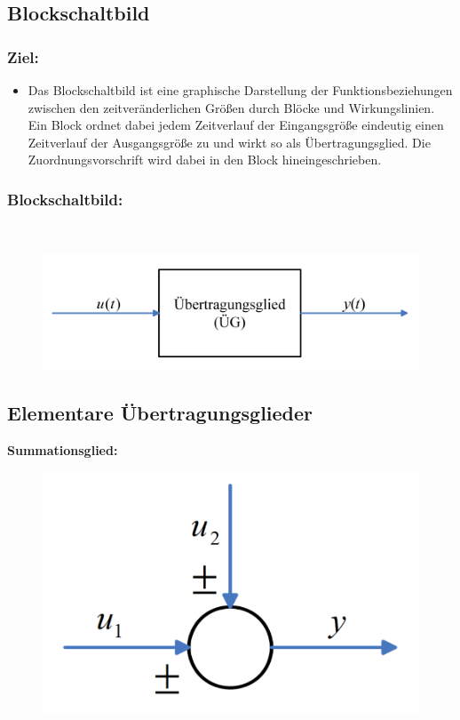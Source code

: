 \documentclass[10pt,a4paper]{article}
\begin{document}
\subsection{Blockschaltbild}
\subsubsection*{Ziel:}
\begin{itemize}
	\item Das Blockschaltbild ist eine graphische Darstellung der Funktionsbeziehungen zwischen den zeitveränderlichen Größen durch Blöcke und Wirkungslinien. Ein Block ordnet dabei jedem Zeitverlauf der Eingangsgröße eindeutig einen Zeitverlauf der Ausgangsgröße zu und wirkt so als Übertragungsglied.
	Die Zuordnungsvorschrift wird dabei in den Block hineingeschrieben.
\end{itemize}

\subsubsection*{Blockschaltbild:} ~\\
\begin{figure}[H]
	\includegraphics[width=0.8\columnwidth]{imgs/abb2_4.png}
\end{figure}

\subsection{Elementare Übertragungsglieder}
\textbf{Summationsglied:}
\begin{figure}[H]
	\includegraphics[width=0.2\columnwidth]{imgs/sumglied.png}
\end{figure}
\end{document}
